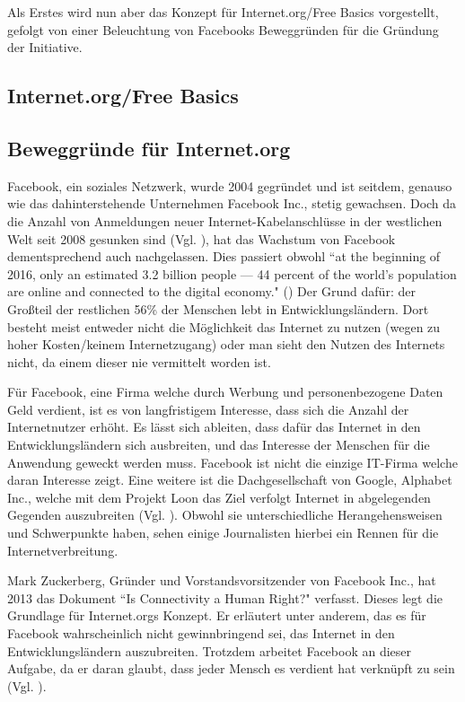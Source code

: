 \documentclass{article}
\begin{document}
Als Erstes wird nun aber das Konzept für Internet.org/Free Basics vorgestellt, gefolgt von einer Beleuchtung von Facebooks Beweggründen für die Gründung der Initiative.

\subsection{Internet.org/Free Basics}

\subsection{Beweggründe für Internet.org}
Facebook, ein soziales Netzwerk, wurde 2004 gegründet und ist seitdem, genauso wie das dahinterstehende Unternehmen Facebook Inc., stetig gewachsen. 
Doch da die Anzahl von Anmeldungen neuer Internet-Kabelanschlüsse in der westlichen Welt seit 2008 gesunken sind
(Vgl. \cite{ICTslowingDown}), hat das Wachstum von Facebook dementsprechend auch nachgelassen.
Dies passiert obwohl ``at the beginning of 2016, only an estimated 3.2 billion people — 44 percent of the world’s population are online and connected to the digital economy." (\cite[7]{connectWorld})
Der Grund dafür: der Großteil der restlichen 56\% der Menschen lebt in Entwicklungsländern. Dort besteht meist entweder nicht die Möglichkeit das Internet zu nutzen (wegen zu hoher Kosten/keinem Internetzugang) oder man sieht den Nutzen des Internets nicht, da einem dieser nie vermittelt worden ist.

\medskip

Für Facebook, eine Firma welche durch Werbung und personenbezogene Daten Geld verdient, ist es von langfristigem Interesse, dass sich die Anzahl der Internetnutzer erhöht.
Es lässt sich ableiten, dass dafür das Internet in den Entwicklungsländern sich ausbreiten, und das Interesse der Menschen für die Anwendung geweckt werden muss.
Facebook ist nicht die einzige IT-Firma welche daran Interesse  zeigt.
Eine weitere ist die Dachgesellschaft von Google, Alphabet Inc., welche mit dem Projekt Loon das Ziel verfolgt Internet in abgelegenden Gegenden auszubreiten (Vgl. \cite{projectLoon}). %
Obwohl sie unterschiedliche Herangehensweisen und Schwerpunkte haben, sehen einige Journalisten hierbei ein Rennen für die Internetverbreitung. 

\medskip

Mark Zuckerberg, Gründer und Vorstandsvorsitzender von Facebook Inc., hat 2013 das Dokument ``Is Connectivity a Human Right?" verfasst.
Dieses legt die Grundlage für Internet.orgs Konzept.
Er erläutert unter anderem, das es für Facebook wahrscheinlich nicht gewinnbringend sei, das Internet in den Entwicklungsländern auszubreiten.
Trotzdem arbeitet Facebook an dieser Aufgabe, da er daran glaubt, dass jeder Mensch es verdient hat verknüpft zu sein (Vgl. \cite[1]{HumanRight}).
\end{document}
